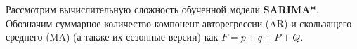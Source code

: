 













Рассмотрим вычислительную сложность обученной модели \textbf{SARIMA*}. Обозначим суммарное количество компонент авторегрессии (AR) и скользящего среднего (MA) (а также их сезонные версии) как $F = p + q + P + Q$. 

